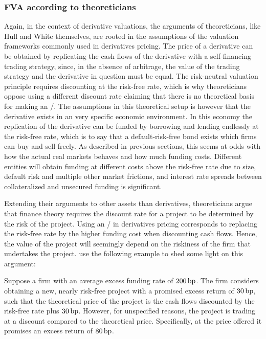 \documentclass[main.tex]{subfiles}
\begin{document}
        \subsubsection{FVA according to theoreticians}
            Again, in the context of derivative valuations, 
            the arguments of theoreticians, like Hull and White themselves, 
            are rooted in the assumptions of the valuation frameworks commonly used in derivatives pricing.
            The price of a derivative can be obtained by replicating the cash flows of the derivative 
            with a self-financing trading strategy, since, in the absence of arbitrage, 
            the value of the trading strategy and the derivative in question must be equal.
            The risk-neutral valuation principle requires discounting at the risk-free rate,
            which is why theoreticians oppose using a different discount rate
            claiming that there is no theoretical basis for making an \FVA/.
            The assumptions in this theoretical setup is however 
            that the derivative exists in an very specific economic environment. 
            In this economy the replication of the derivative
            can be funded by borrowing and lending endlessly at the risk-free rate,
            which is to say that a default-risk-free bond exists which firms can buy and sell freely.
            As described in previous sections,
            this seems at odds with how the actual real markets behaves and how much funding costs.
            Different entities will obtain funding at different costs above the risk-free rate due to size,
            default risk and multiple other market frictions,
            and interest rate spreads between collateralized and unsecured funding is significant.

            Extending their arguments to other assets than derivatives, 
            theoreticians argue that finance theory requires the discount rate for a project 
            to be determined by the risk of the project.
            Using an \FVA/ in derivatives pricing corresponds to replacing the risk-free rate by the higher funding cost
            when discounting cash flows.
            Hence, the value of the project will seemingly depend on the riskiness of the firm that undertakes the project.
            \textcite{HullWhite2012FVA} use the following example to shed some light on this argument:

            Suppose a firm with an average excess funding rate of $200\,\text{bp}$. 
            The firm considers obtaining a new, nearly risk-free project with a promised excess return of $30\,\text{bp}$,
            such that the theoretical price of the project is the cash flows 
            discounted by the risk-free rate plus $30\,\text{bp}$.
            However, for unspecified reasons, the project is trading at a discount compared to the theoretical price.
            Specifically, at the price offered it promises an excess return of $80\,\text{bp}$.
            
\end{document}
